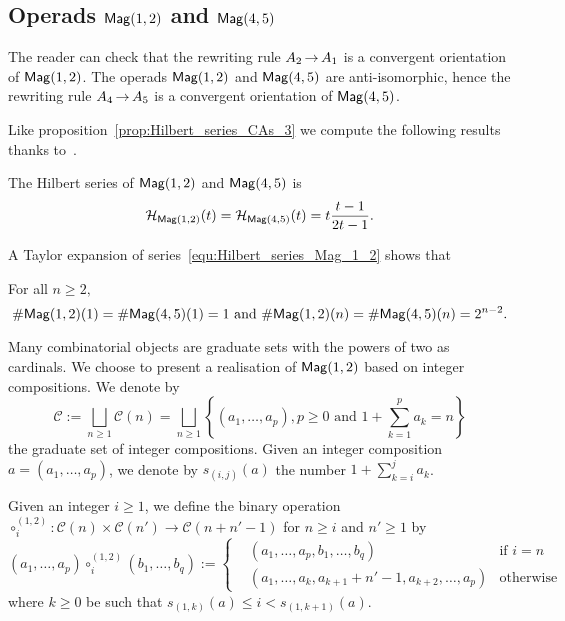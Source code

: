 \subsection{Operads \texorpdfstring{$\mathsf{Mag}(1,2)$}{Mag(1,2)} and 
\texorpdfstring{$\mathsf{Mag}(4,5)$}{Mag(4,5)}} \label{sub:Mag_1_2}
The reader can check that the rewriting rule $A_2 \operatorname{\to} A_1$ is a 
convergent orientation of $\mathsf{Mag}(1,2)$. The operads $\mathsf{Mag}(1,2)$ and 
$\mathsf{Mag}(4,5)$ are anti-isomorphic, hence the rewriting rule $A_4 \operatorname{\to} A_5$ 
is a convergent orientation of $\mathsf{Mag}(4,5)$. 

Like proposition~\eqref{prop:Hilbert_series_CAs_3} we compute the 
following results thanks to~\cite{Gir18}.
\begin{Proposition} \label{prop:Hilbert_series_Mag_1_2}
The Hilbert series of $\mathsf{Mag}(1,2)$ and $\mathsf{Mag}(4,5)$ is
\begin{equation} \label{equ:Hilbert_series_Mag_1_2}
\mathcal{H}_{\mathsf{Mag}(1,2)}(t) = \mathcal{H}_{\mathsf{Mag}(4,5)}(t) = 
t\frac{t-1}{2t -1}.
\end{equation}
\end{Proposition}

A Taylor expansion of series~\eqref{equ:Hilbert_series_Mag_1_2} shows 
that 
\begin{Proposition} \label{prop:Close_formula_Mag_1_2}
For all $n \geq 2,$
\begin{equation} \label{equ:Close_formula_Mag_1_2}
\# \mathsf{Mag}(1,2)(1) = \# \mathsf{Mag}(4,5)(1) = 1 \text{ and } \# \mathsf{Mag}(1,2)(n) = 
\# \mathsf{Mag}(4,5)(n) = 2^{n-2}.
\end{equation}
\end{Proposition}

Many combinatorial objects are graduate sets with the powers of two as 
cardinals. We choose to present a realisation of $\mathsf{Mag}(1,2)$ based on 
integer compositions. We denote by 
\begin{equation}
\mathcal{C} := \bigsqcup\limits_{n \geq 1} \mathcal{C}(n) = 
\bigsqcup\limits_{n \geq 1}\left\{ (a_1 , \dots, a_p), p \geq 0 
\text{ and } 1+\sum\limits_{k = 1}^{p} a_k = n \right\}
\end{equation}
the graduate set of integer compositions. Given an integer composition 
$a = (a_1 , \dots, a_p)$, we denote by $s_{(i,j)}(a)$ the number 
$1 + \sum\limits_{k = i}^{j} a_k$.

Given an integer $i \geq 1$, we define the binary operation 
$\circ_i^{(1,2)} : \mathcal{C}(n) \times \mathcal{C}(n') \rightarrow \mathcal{C}(n + n' -1)$ for 
$n \geq i$ and $n' \geq 1$ by
\begin{equation}
\left(a_1 , \dots, a_p \right) \circ_i^{(1,2)} 
\left(b_1, \dots ,b_{q}\right) := \left\{
 \begin{split}
 & \left(a_1, \dots ,a_{p}, b_1, \dots ,b_{q}\right) & 
    \text{if } i = n\\ 
 & \left(a_1, \dots, a_{k}, a_{k+1} + n'-1, a_{k+2}, \dots ,a_{p}\right)
  & \text{otherwise}
 \end{split}
\right.
\end{equation}
where $k \geq 0$ be such that $s_{(1,k)}(a) \leq i < s_{(1,k+1)}(a)$.


